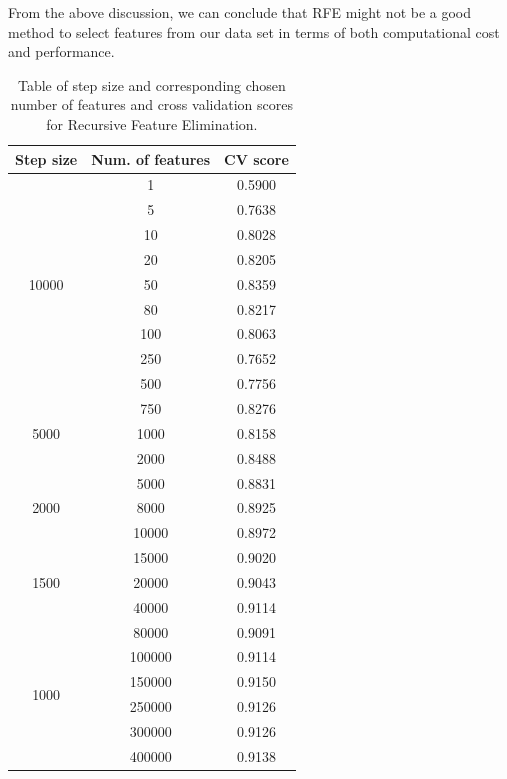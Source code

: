 \documentclass[12pt, twoside, a4paper]{report}
\begin{document}
From the above discussion, we can conclude that RFE might not be a good method to select features from our data set in terms of both computational cost and performance.

\begin{table}
\centering
    \begin{tabular}{ | c | c | c | } \hline
    Step size & Num. of features & CV score \\ \hline
    \multirow{9}{*}{10000} & 
  1 & 0.5900  \\
 & 5 & 0.7638   \\
 & 10 & 0.8028  \\
 & 20 & 0.8205  \\
 & 50 & 0.8359 \\
 & 80 & 0.8217 \\
 & 100 & 0.8063 \\
 & 250 & 0.7652 \\
 & 500 & 0.7756 \\ \hline
 
 \multirow{3}{*}{5000} & 
  750 & 0.8276  \\
 & 1000 & 0.8158 \\
 & 2000 & 0.8488 \\ \hline
 
 \multirow{3}{*}{2000} & 
  5000 & 0.8831 \\
 & 8000 & 0.8925 \\
 & 10000 & 0.8972 \\ \hline
 
 \multirow{3}{*}{1500} & 
  15000 & 0.9020 \\
 & 20000 & 0.9043 \\
 & 40000 & 0.9114 \\ \hline
 
 \multirow{6}{*}{1000} & 
  80000 & 0.9091 \\
 & 100000 & 0.9114 \\
 & 150000 & 0.9150 \\
  & 250000 & 0.9126 \\
   & 300000 & 0.9126 \\
    & 400000 & 0.9138 \\ \hline
    \end{tabular}
\caption{Table of step size and corresponding chosen number of features and cross validation scores for Recursive Feature Elimination.}
\label{rfe_results_table}
\end{table}
\end{document}
